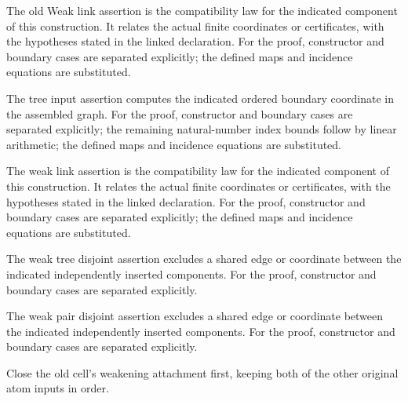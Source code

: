 The old Weak link assertion is the compatibility law for the indicated component of this construction. It relates the actual finite coordinates or certificates, with the hypotheses stated in the linked declaration.
For the proof, constructor and boundary cases are separated explicitly; the defined maps and incidence equations are substituted.
\par{}

The tree input assertion computes the indicated ordered boundary coordinate in the assembled graph.
For the proof, constructor and boundary cases are separated explicitly; the remaining natural-number index bounds follow by linear arithmetic; the defined maps and incidence equations are substituted.
\par{}

The weak link assertion is the compatibility law for the indicated component of this construction. It relates the actual finite coordinates or certificates, with the hypotheses stated in the linked declaration.
For the proof, constructor and boundary cases are separated explicitly; the defined maps and incidence equations are substituted.
\par{}

The weak tree disjoint assertion excludes a shared edge or coordinate between the indicated independently inserted components.
For the proof, constructor and boundary cases are separated explicitly.
\par{}

The weak pair disjoint assertion excludes a shared edge or coordinate between the indicated independently inserted components.
For the proof, constructor and boundary cases are separated explicitly.
\par{}

Close the old cell's weakening attachment first, keeping both of the other original atom inputs in order.
\par{}

